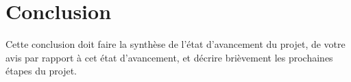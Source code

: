 
	\chapter*{Conclusion}
	
	Cette conclusion doit faire la synthèse de l'état d'avancement du projet, de votre avis par rapport à cet état d'avancement, et décrire brièvement les prochaines étapes du projet.